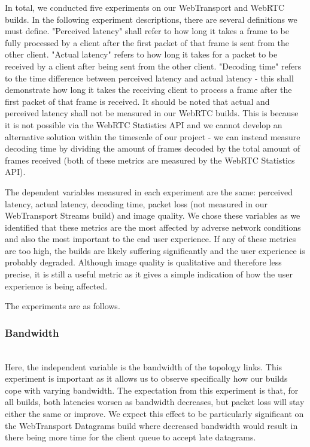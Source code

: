 In total, we conducted five experiments on our WebTransport and WebRTC builds. In the following experiment descriptions, there are several definitions we must define. "Perceived latency" shall refer to how long it takes a frame to be fully processed by a client after the first packet of that frame is sent from the other client. "Actual latency" refers to how long it takes for a packet to be received by a client after being sent from the other client. "Decoding time" refers to the time difference between perceived latency and actual latency - this shall demonstrate how long it takes the receiving client to process a frame after the first packet of that frame is received. It should be noted that actual and perceived latency shall not be measured in our WebRTC builds. This is because it is not possible via the WebRTC Statistics API and we cannot develop an alternative solution within the timescale of our project - we can instead measure decoding time by dividing the amount of frames decoded by the total amount of frames received (both of these metrics are measured by the WebRTC Statistics API).

The dependent variables measured in each experiment are the same: perceived latency, actual latency, decoding time, packet loss (not measured in our WebTransport Streams build) and image quality. We chose these variables as we identified that these metrics are the most affected by adverse network conditions and also the most important to the end user experience. If any of these metrics are too high, the builds are likely suffering significantly and the user experience is probably degraded.  Although image quality is qualitative and therefore less precise, it is still a useful metric as it gives a simple indication of how the user experience is being affected.

The experiments are as follows.
\hfill{}\\
\subsubsection*{Bandwidth}
\hfill{}\\
Here, the independent variable is the bandwidth of the topology links. This experiment is important as it allows us to observe specifically how our builds cope with varying bandwidth. 
The expectation from this experiment is that, for all builds, both latencies worsen as bandwidth decreases, but packet loss will stay either the same or improve. We expect this effect to be particularly significant on the WebTransport Datagrams build where decreased bandwidth would result in there being more time for the client queue to accept late datagrams.
\hfill{}\\
